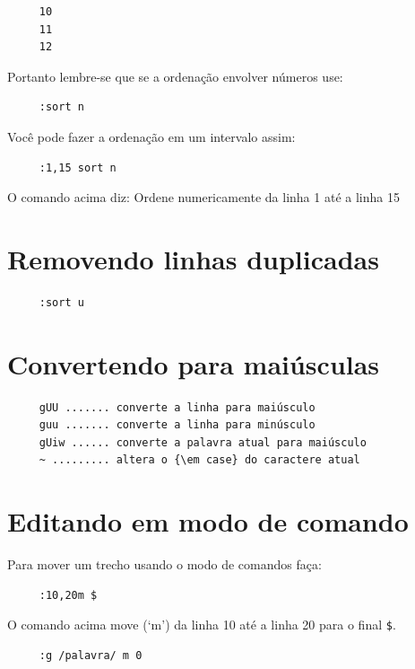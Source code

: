 \documentclass[10pt,a4paper,openany]{book}
\begin{document}
\begin{verbatim}
     10
     11
     12
\end{verbatim}

Portanto lembre-se que se a ordenação envolver números use:

\begin{verbatim}
     :sort n
\end{verbatim}

Você pode fazer a ordenação em um intervalo assim:

\begin{verbatim}
     :1,15 sort n
\end{verbatim}

O comando acima diz: Ordene numericamente da linha 1 até a linha 15

\section{Removendo linhas duplicadas}

\begin{verbatim}
     :sort u
\end{verbatim}


\section{Convertendo para maiúsculas}
\label{sec:Convertendo para maiúsculas}

\begin{verbatim}
     gUU ....... converte a linha para maiúsculo
	 guu ....... converte a linha para minúsculo
	 gUiw ...... converte a palavra atual para maiúsculo
	 ~ ......... altera o {\em case} do caractere atual
\end{verbatim}


\section{Editando em modo de comando}\label{sec:Editando em modo de comando}

Para mover um trecho usando o modo de comandos faça:

\begin{verbatim}
     :10,20m $
\end{verbatim}

O comando acima move (`m') da linha 10 até a linha 20 para o final \verb|$|.

\begin{verbatim}
     :g /palavra/ m 0
\end{verbatim}
\end{document}
